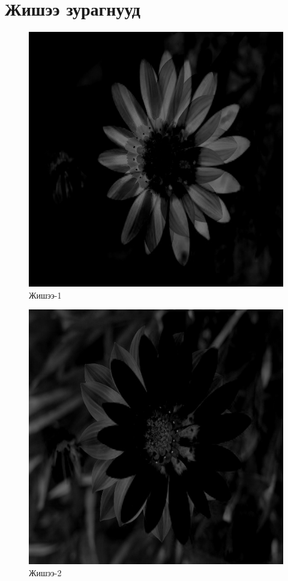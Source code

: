 \appendix
{}

\chapter{Жишээ зурагнууд}
\begin{figure}
	\centering
	\includegraphics[scale=0.8]{src/img/pic1.png}
	\caption{Жишээ-1}
\end{figure}
\begin{figure}
	\centering
	\includegraphics[scale=0.8]{src/img/pic2.png}
	\caption{Жишээ-2}
\end{figure}


